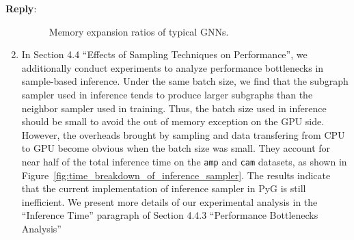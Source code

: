 \documentclass[12pt]{article}
\newenvironment{reply}
   {\medskip \noindent \textbf{Reply}:\  }
   {\medskip}
\begin{document}
\begin{reply}
\begin{enumerate}
    \begin{figure}[h]
        \caption{Memory expansion ratios of typical GNNs.}
        \label{fig:compare_memory_expasion_ratio}
    \end{figure}
    
    \item In Section 4.4 ``Effects of Sampling Techniques on Performance'', we additionally conduct experiments to analyze performance bottlenecks in sample-based inference.
    Under the same batch size, we find that the subgraph sampler used in inference tends to produce larger subgraphs than the neighbor sampler used in training.
    Thus, the batch size used in inference should be small to avoid the out of memory exception on the GPU side.
    However, the overheads brought by sampling and data transfering from CPU to GPU become obvious when the batch size was small.
    They account for near half of the total inference time on the \texttt{amp} and \texttt{cam} datasets, as shown in Figure~\ref{fig:time_breakdown_of_inference_sampler}.
    The results indicate that the current implementation of inference sampler in PyG is still inefficient.
    We present more details of our experimental analysis in the ``Inference Time'' paragraph of Section 4.4.3 ``Performance Bottlenecks Analysis''
    

\end{enumerate}
\end{reply}
\end{document}
